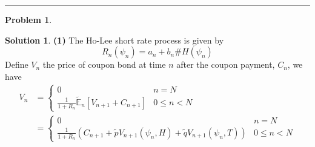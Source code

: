 \documentclass[a4paper, 10pt]{article}
\theoremstyle{definition}
\newtheorem{problem}{Problem}
\theoremstyle{hSol}
\newtheorem*{solution}{Solution}
\begin{document}
\noindent\rule{16cm}{0.4pt}
\begin{problem} 
\end{problem}
\begin{solution} \textbf{(1)} The Ho-Lee short rate process is given by
\begin{equation}
  R_n(\psi_n) = a_n + b_n\#H(\psi_n)
\end{equation}
Define $V_n$ the price of coupon bond at time $n$ after the coupon payment, $C_n$, we have
\begin{equation}
  \begin{split}
  V_n &= \begin{cases}
  0 & n=N\\
  \frac{1}{1+R_{n}}\tilde{\mathbb{E}}_n\left[V_{n+1} + C_{n+1}\right] & 0\leq n < N
  \end{cases} \\
  &=\begin{cases}
  0 & n=N\\
  \frac{1}{1+R_{n}}\left(C_{n+1} + \tilde{p}V_{n+1}(\psi_n, H) + \tilde{q}V_{n+1}(\psi_n, T)\right) & 0\leq n < N
  \end{cases}
  \end{split}
\end{equation}


\end{solution}
\end{document}
